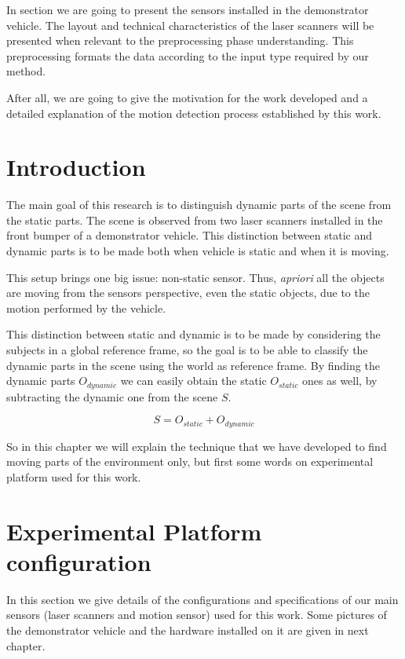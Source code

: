 In section we are going to present the sensors installed in the demonstrator vehicle. The layout and technical characteristics of the laser scanners will be presented when relevant to the preprocessing phase understanding. This preprocessing formats the data according to the input type required by our method.

After all, we are going to give the motivation for the work developed and a detailed explanation of the motion detection process established by this work.

\section{Introduction}

The main goal of this research is to distinguish dynamic parts of the scene from the static parts. The scene is observed from two laser scanners installed in the front bumper of a demonstrator vehicle. This distinction between static and dynamic parts is to be made both when vehicle is static and when it is moving.

This setup brings one big issue: non-static sensor. Thus, \textit{apriori} all the objects are moving from the sensors perspective, even the static objects, due to the motion performed by the vehicle.

This distinction between static and dynamic is to be made by considering the subjects in a global reference frame, so the goal is to be able to classify the dynamic parts in the scene using the world as reference frame. By finding the dynamic parts $O_{dynamic}$ we can easily obtain the static $O_{static}$ ones as well, by subtracting the dynamic one from the scene $S$.

\begin{equation}
S=O_{static}+O_{dynamic}
\end{equation}

So in this chapter we will explain the technique that we have developed to find moving parts of the environment only, but first some words on experimental platform used for this work.

\section{Experimental Platform configuration} %
\label{sec:demonstrator}
In this section we give details of the configurations and specifications of our main sensors (laser scanners and motion sensor) used for this work. Some pictures of the demonstrator vehicle and the hardware installed on it are given in next chapter.

